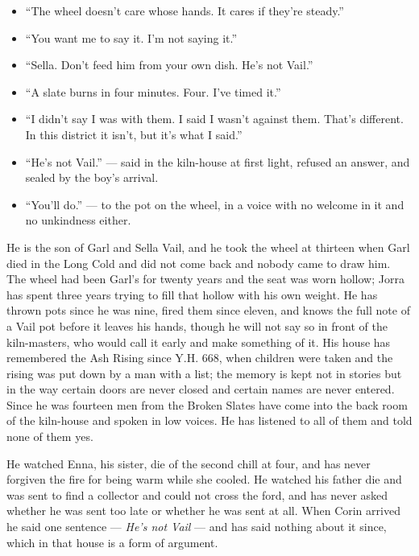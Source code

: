 \documentclass{design/chronicle}
\begin{document}
{\begin{itemize}[leftmargin=1.4em,itemsep=1pt,topsep=3pt,parsep=0pt]
\item “The wheel doesn’t care whose hands. It cares if they’re steady.”

\item “You want me to say it. I’m not saying it.”

\item “Sella. Don’t feed him from your own dish. He’s not Vail.”

\item “A slate burns in four minutes. Four. I’ve timed it.”

\item “I didn’t say I was with them. I said I wasn’t against them. That’s different. In this district it isn’t, but it’s what I said.”

\item “He’s not Vail.” --- said in the kiln-house at first light, refused an answer, and sealed by the boy’s arrival.

\item “You’ll do.” --- to the pot on the wheel, in a voice with no welcome in it and no unkindness either.

\end{itemize}

He is the son of Garl and Sella Vail, and he took the wheel at thirteen when Garl died in the Long Cold and did not come back and nobody came to draw him. The wheel had been Garl’s for twenty years and the seat was worn hollow; Jorra has spent three years trying to fill that hollow with his own weight. He has thrown pots since he was nine, fired them since eleven, and knows the full note of a Vail pot before it leaves his hands, though he will not say so in front of the kiln-masters, who would call it early and make something of it. His house has remembered the Ash Rising since Y.H. 668, when children were taken and the rising was put down by a man with a list; the memory is kept not in stories but in the way certain doors are never closed and certain names are never entered. Since he was fourteen men from the Broken Slates have come into the back room of the kiln-house and spoken in low voices. He has listened to all of them and told none of them yes.

He watched Enna, his sister, die of the second chill at four, and has never forgiven the fire for being warm while she cooled. He watched his father die and was sent to find a collector and could not cross the ford, and has never asked whether he was sent too late or whether he was sent at all. When Corin arrived he said one sentence — \emph{He’s not Vail} — and has said nothing about it since, which in that house is a form of argument.

}
\end{document}
